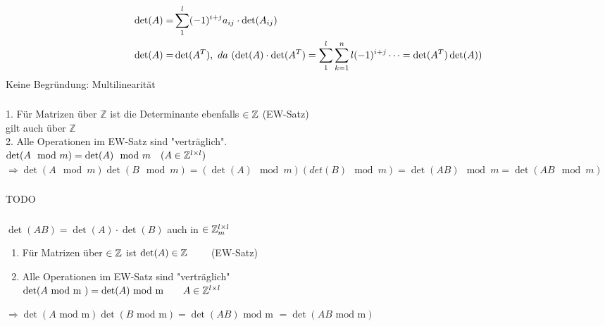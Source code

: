 \documentclass[main.tex]{subfiles}
\begin{document}
\subsection{}
\subsubsection{}
\begin{align*}
	\det(A) = & \sum_{1}^{l} (-1)^{i+j} a_{ij}\cdot \det (A_{ij})\\
	\det(A) = & \det(A^T), \ da \ (\det(A)\cdot\det(A^T) = \sum_{1}^{l}\sum_{k=1}^{n}{l}(-1)^{i+j}\cdots = \det(A^T)\det(A))  
\end{align*}
Keine Begründung: Multilinearität

\subsubsection{}
1. Für Matrizen über $\mathbb{Z}$ ist die Determinante ebenfalls $\in \mathbb{Z}$ (EW-Satz)\\
gilt auch über $\mathbb{Z}$\\
2. Alle Operationen im EW-Satz sind "verträglich".\\
$\det(A \mod m) = \det(A) \mod m \quad (A \in \mathbb{Z}^{l\times l})$\\
$\Rightarrow \det(A\mod m) \det(B \mod m) = (\det(A) \mod m) (det(B) \mod m) = \det(AB) \mod m = \det(AB \mod m)$

\subsubsection{}
TODO
\subsubsection{}
	$ \det(AB) = \det(A) \cdot \det(B) $ auch in $ \in \mathbb{Z}_m^{l\times l} $
	\begin{enumerate}
		\item Für Matrizen über $ \in \mathbb{Z} $ ist $ \det(A) \in \mathbb{Z} \qquad $ (EW-Satz) 
		\item Alle Operationen im EW-Satz sind "verträglich" \\
		$ \det(A\text{ mod m }) = \det(A) \text{ mod m} \qquad A \in \mathbb{Z}^{l\times l}$
	\end{enumerate}
	$ \Rightarrow \det(A \text{ mod m}) \det(B\text{ mod m}) = \det(AB) \text{ mod m } = \det(AB \text{ mod m}) $
\end{document}
